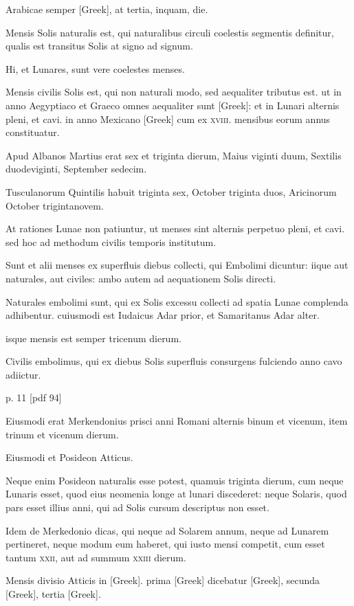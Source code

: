Arabicae semper \textgreek{[Greek]},
at tertia, inquam, die.

Mensis Solis naturalis est,
qui naturalibus circuli coelestis segmentis definitur, qualis est transitus
Solis at signo ad signum.

Hi, et Lunares, sunt vere coelestes menses.

Mensis civilis Solis est, qui non naturali modo, sed aequaliter tributus
est. ut in anno Aegyptiaco et Graeco omnes aequaliter sunt \textgreek{[Greek]}:
et in Lunari alternis pleni, et cavi. in anno Mexicano \textgreek{[Greek]}
cum ex \textsc{xviii}. mensibus eorum annus constituatur.

Apud Albanos
Martius erat sex et triginta dierum, Maius viginti duum, Sextilis
duodeviginti, September sedecim.

Tusculanorum Quintilis habuit
triginta sex, October triginta duos, Aricinorum October trigintanovem.

At rationes Lunae non patiuntur, ut menses sint alternis
perpetuo pleni, et cavi. sed hoc ad methodum civilis temporis institutum.

Sunt et alii menses ex superfluis diebus collecti, qui Embolimi
dicuntur: iique aut naturales, aut civiles: ambo autem ad aequationem
Solis directi.

Naturales embolimi sunt, qui ex Solis excessu collecti
ad spatia Lunae complenda adhibentur. cuiusmodi est Iudaicus
Adar prior, et Samaritanus Adar alter.

isque mensis est semper tricenum dierum.

Civilis embolimus, qui ex diebus Solis superfluis consurgens
fulciendo anno cavo adiictur.


p. 11 [pdf 94]

Eiusmodi erat Merkendonius
prisci anni Romani alternis binum et vicenum, item trinum et vicenum
dierum.

Eiusmodi et Posideon Atticus.

Neque enim Posideon
naturalis esse potest, quamuis triginta dierum, cum neque Lunaris
esset, quod eius neomenia longe at lunari discederet: neque Solaris,
quod pars esset illius anni, qui ad Solis cursum descriptus non esset.

Idem de Merkedonio dicas, qui neque ad Solarem annum, neque ad
Lunarem pertineret, neque modum eum haberet, qui iusto mensi
competit, cum esset tantum \textsc{xxii}, aut ad summum \textsc{xxiii} dierum.

Mensis divisio Atticis in \textgreek{[Greek]}.
 prima \textgreek{[Greek]} dicebatur \textgreek{[Greek]},
secunda \textgreek{[Greek]}, tertia \textgreek{[Greek]}.

